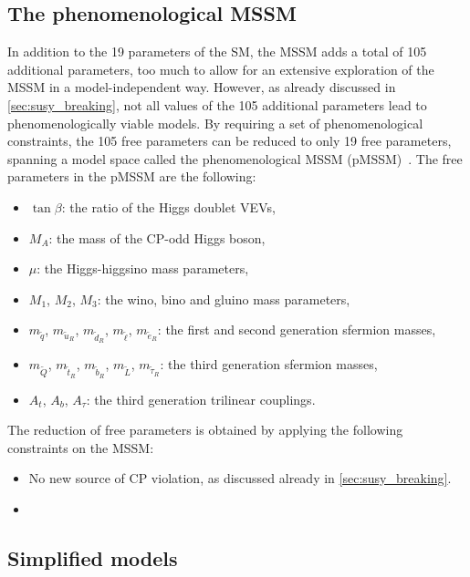 \subsection{The phenomenological MSSM}

In addition to the 19 parameters of the SM, the MSSM adds a total of 105 additional parameters, too much to allow for an extensive exploration of the MSSM in a model-independent way. However, as already discussed in \cref{sec:susy_breaking}, not all values of the 105 additional parameters lead to phenomenologically viable models. By requiring a set of phenomenological constraints, the 105 free parameters can be reduced to only 19 free parameters, spanning a model space called the phenomenological MSSM (pMSSM)~\cite{Djouadi:2002ze,Berger_2009}. The free parameters in the pMSSM are the following:
\begin{itemize}
	\item $\tan{\beta}$: the ratio of the Higgs doublet VEVs,
	\item $M_A$: the mass of the CP-odd Higgs boson,
	\item $\mu$: the Higgs-higgsino mass parameters,
	\item $M_1$, $M_2$, $M_3$: the wino, bino and gluino mass parameters,
	\item $m_{\tilde{q}}$, $m_{\tilde{u}_R}$, $m_{\tilde{d}_R}$, $m_{\tilde{\ell}}$, $m_{\tilde{e}_R}$: the first and second generation sfermion masses,
	\item $m_{\tilde{Q}}$, $m_{\tilde{t}_R}$, $m_{\tilde{b}_R}$, $m_{\tilde{L}}$, $m_{\tilde{\tau}_R}$: the third generation sfermion masses,
	\item $A_t$, $A_b$, $A_\tau$: the third generation trilinear couplings.
\end{itemize}

The reduction of free parameters is obtained by applying the following constraints on the MSSM:
\begin{itemize}
	\item No new source of CP violation, as discussed already in \cref{sec:susy_breaking}.
	\item 
\end{itemize}


\subsection{Simplified models}